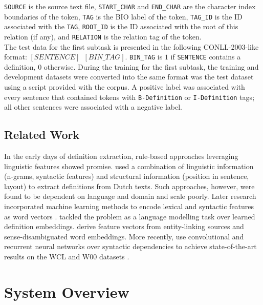 \documentclass[11pt]{article}
\begin{document}
{\small\texttt{SOURCE}} is the source text file, {\small\texttt{START\_CHAR}} and {\small\texttt{END\_CHAR}} are the character index
boundaries of the token, {\small\texttt{TAG}} is the BIO label of the token, {\small\texttt{TAG\_ID}} is the ID
associated with the {\small\texttt{TAG}}, {\small\texttt{ROOT\_ID}} is the ID associated with the root of this relation
(if any), and {\small\texttt{RELATION}} is the relation tag of the token.\\

The test data for the first subtask is presented in the following CONLL-2003-like format:
{\small\texttt{$[SENTENCE]\hspace{6pt}[BIN\_TAG]$}}. {\small\texttt{BIN\_TAG}} is $1$ if
{\small\texttt{SENTENCE}} contains a definition, $0$ otherwise. During the training for the first subtask, the training and
development datasets were converted into the same format was the test dataset using a script provided with the corpus. A positive
label was associated with every sentence that contained tokens with {\small\texttt{B-Definition}} or {\small\texttt{I-Definition}} tags;
all other sentences were associated with a negative label.


\subsection{Related Work}
In the early days of definition extraction, rule-based approaches leveraging  linguistic features showed promise.
 used a combination of linguistic information (n-grams, syntactic features) and
structural information (position in sentence, layout) to extract definitions from Dutch texts. Such approaches, however,
were found to be dependent on language and domain and scale poorly. Later research incorporated machine learning
methods to encode lexical and syntactic features as word vectors \cite{del2014coping}. 
tackled the problem as a language modelling task over learned definition embeddings. 
derive feature vectors from entity-linking sources and sense-disambiguated word embeddings. More recently,
 use convolutional and recurrent neural networks over syntactic dependencies to achieve
state-of-the-art results on the WCL and W00 datasets \cite{navigli2010learning,jin2013mining}.


\section{System Overview}
\end{document}
